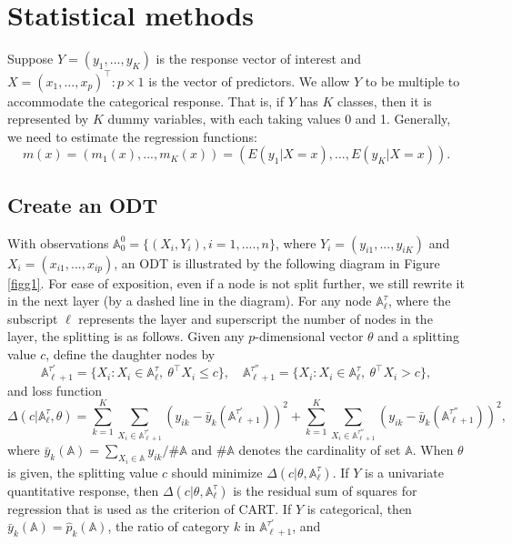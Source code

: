 \section{Statistical methods} \label{sec:models}

Suppose $ Y = (y_1, ..., y_K) $ is the response vector of interest and $ X = (x_1, ..., x_p)^\top : p \times 1 $ is the vector of predictors.  We allow $ Y$ to be multiple to accommodate the categorical response. That is, if $ Y$ has $K$ classes, then it is represented by $ K $ dummy variables, with each taking values 0 and 1.  Generally, we need to estimate the regression functions:
$$
m(x) = (m_1(x), ..., m_K(x)) = (E(y_1|X=x), ..., E(y_K|X=x)).
$$

\subsection{Create an ODT}
With observations $ \mathbb{A}^0_0 = \{(X_i, Y_i), i = 1, ...., n \}$, where $ Y_i = (y_{i1}, ..., y_{iK}) $ and $ X_i = (x_{i1}, ..., x_{ip}) $,
an ODT is illustrated by the following diagram in Figure \ref{figg1}. For ease of exposition, even if a node is not split further, we still rewrite it in the next layer (by a dashed line in the diagram).   For any node
$\mathbb{A}_\ell^\tau $, where the subscript $ \ell $  represents the layer and superscript the number of nodes in the layer, the splitting is as follows. Given any $p$-dimensional vector  $\theta$ and a splitting value $ c $, define the daughter nodes by
$$
	\mathbb{A}_{\ell+1}^{\tau'} = \{ X_i: X_i \in \mathbb{A}_{\ell}^\tau, \ \theta^\top X_i \le c\}, \quad
	\mathbb{A}_{\ell+1}^{\tau''} = \{ X_i: X_i \in \mathbb{A}_{\ell}^\tau, \ \theta^\top X_i > c\},
$$
and loss function
$$
\Delta(c| \mathbb{A}_\ell^\tau, \theta)=  \sum_{k=1}^K \sum_{X_i \in \mathbb{A}_{\ell+1}^{\tau'}} (y_{ik} - \bar y_k(\mathbb{A}_{\ell+1}^{\tau'}))^2  + \sum_{k=1}^K \sum_{X_i \in \mathbb{A}_{\ell+1}^{\tau''}} (y_{ik} - \bar y_k(\mathbb{A}_{\ell+1}^{\tau''}))^2,
$$
where $ \bar y_k(\mathbb{A}) = \sum_{X_i \in \mathbb{A}} y_{ik} /\#\mathbb{A} $  and $ \#\mathbb{A} $ denotes the cardinality of  set $ \mathbb{A}$.  When $ \theta $ is given, the splitting value $ c$ should minimize $ \Delta(c|\theta,  \mathbb{A}_\ell^\tau)$. If $Y$ is a univariate  quantitative response, then $ \Delta(c|\theta,  \mathbb{A}_\ell^\tau)$ is the residual sum of squares for regression that is used as the criterion of CART. If $Y$ is categorical, then $ \bar y_k(\mathbb{A})  =  \hat p_k(\mathbb{A}) $, the ratio of category $ k $ in $ \mathbb{A}_{\ell+1}^{\tau'} $, and
